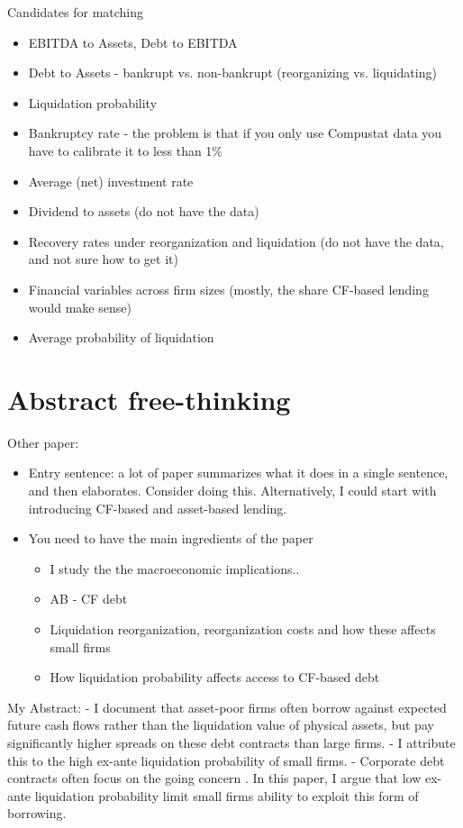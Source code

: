 \documentclass[12pt]{article}
\begin{document}
\noindent Candidates for matching
\begin{itemize}\setlength\itemsep{0em} \small
    \item EBITDA to Assets, Debt to EBITDA
    \item Debt to Assets - bankrupt vs. non-bankrupt (reorganizing vs. liquidating)
    \item Liquidation probability
    \item Bankruptcy rate - the problem is that if you only use Compustat data you have to calibrate it to less than 1\%
    \item Average (net) investment rate
    \item Dividend to assets (do not have the data)
    \item Recovery rates under reorganization and liquidation (do not have the data, and not sure how to get it)
    \item Financial variables across firm sizes (mostly, the share CF-based lending would make sense)
    \item Average probability of liquidation
    \end{itemize} \normalsize


\newpage
\section*{Abstract free-thinking}

Other paper: 
\begin{itemize}
    \item Entry sentence: a lot of paper summarizes what it does in a single sentence, and then elaborates. Consider doing this. Alternatively, I could start with introducing CF-based and asset-based lending. 
    \item You need to have the main ingredients of the paper 
    \begin{itemize}
        \item I study the the macroeconomic implications.. 
        \item AB - CF debt
        \item Liquidation reorganization, reorganization costs and how these affects small firms 
        \item How liquidation probability affects access to CF-based debt 
    \end{itemize}
\end{itemize}


My Abstract: 
 - I document that asset-poor firms often borrow against expected future cash flows rather than the liquidation value of physical assets, but pay significantly higher spreads on these debt contracts than large firms. 
 - I attribute this to the high ex-ante liquidation probability of small firms.
 - Corporate debt contracts often focus on the going concern . In this paper, I argue that low ex-ante liquidation probability limit small firms ability to exploit this form of borrowing.
\end{document}

